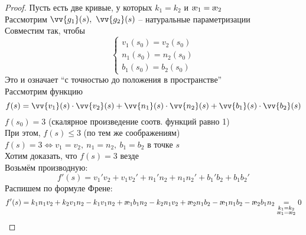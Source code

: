 \begin{proof}
	Пусть есть две кривые, у которых $ k_1 = k_2 $ и $ \text\ae_1 = \text\ae_2 $ \\
	Рассмотрим $ \vv{g_1}(s), ~ \vv{g_2}(s) $ -- натуральные параметризации \\
	Совместим так, чтобы
	$$
	\begin{cases}
		v_1(s_0) = v_2(s_0) \\
		n_1(s_0) = n_2(s_0) \\
		b_1(s_0) = b_2(s_0)
	\end{cases} $$
	Это и означает ``с точностью до положения в пространстве'' \\
	Рассмотрим функцию
	$$ f(s) = \vv{v_1}(s) \cdot \vv{v_2}(s) + \vv{n_1}(s) \cdot \vv{n_2}(s) + \vv{b_1}(s) \cdot \vv{b_2}(s) $$
	$ f(s_0) = 3 $ (скалярное произведение соотв. функций равно 1) \\
	При этом, $ f(s) \le 3 $ (по тем же соображениям) \\
	$ f(s) = 3 \iff v_1 = v_2, ~ n_1 = n_2, ~ b_1 = b_2 $ в точке $ s $ \\
	Хотим доказать, что $ f(s) = 3 $ везде \\
	Возьмём производную:
	$$ f'(s) = v_1'v_2 + v_1v_2' + n_1'n_2 + n_1n_2' + b_1'b_2 + b_1b_2' $$
	Распишем по формуле Френе:
	$$ f'(s) = k_1n_1v_2 + k_2v_1n_2 - k_1v_1n_2 + \text\ae_1b_1n_2 - k_2n_1v_2 + \text\ae_2n_1b_2 - \text\ae_1n_1b_2 - \text\ae_2b_1n_2 \underset{
		\begin{subarray}{c}
			k_1 = k_2 \\
			\text\ae_1 = \text\ae_2
		\end{subarray}}= 0 $$
\end{proof}
